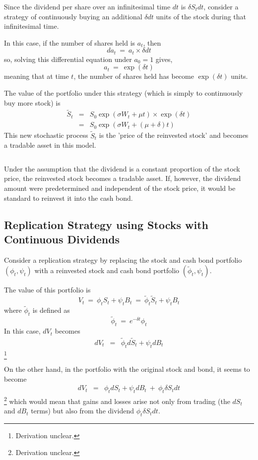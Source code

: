 \documentclass[uplatex,a4j,12pt,dvipdfmx]{jsarticle}
\begin{document}
${}$

Since the dividend per share over an infinitesimal time $dt$ is $\delta S_{t} dt$, consider a strategy of continuously buying an additional $\delta dt$ units of the stock during that infinitesimal time.

In this case, if the number of shares held is $a_{t}$, then
$$
	d a_{t} \ = \ a_{t} \times \delta dt
$$
so, solving this differential equation under $a_{0}=1$ gives,
$$
	a_{t} \ = \ \exp ( \delta t )
$$
meaning that at time $t$, the number of shares held has become $\exp ( \delta t )$ units.

The value of the portfolio under this strategy (which is simply to continuously buy more stock) is
%
\begin{eqnarray*}
	\tilde{S}_{t}
	&=&
	S_{0} \exp (\sigma W_{t} + \mu t ) \times \exp ( \delta t )
	\\ &=&
	S_{0} \exp (\sigma W_{t} + ( \mu + \delta ) t )
\end{eqnarray*}
%
This new stochastic process $\tilde{S}_{t}$ is the 'price of the reinvested stock' and becomes a tradable asset in this model.

${}$

Under the assumption that the dividend is a constant proportion of the stock price, the reinvested stock becomes a tradable asset. If, however, the dividend amount were predetermined and independent of the stock price, it would be standard to reinvest it into the cash bond.

\subsection{Replication Strategy using Stocks with Continuous Dividends}

Consider a replication strategy by replacing the stock and cash bond portfolio $(\phi_{t},\psi_{t})$ with a reinvested stock and cash bond portfolio $(\tilde{\phi}_{t},\psi_{t})$.

The value of this portfolio is
$$
	V_{t}
	\ = \
	\phi_{t} S_{t} + \psi_{t} B_{t}
	\ = \
	\tilde{\phi}_{t} \tilde{S}_{t} + \psi_{t} B_{t}
$$
where $\tilde{\phi}_{t}$ is defined as
$$
	\tilde{\phi}_{t} \ = \
	e^{- \delta t} \phi_{t}
$$
In this case, $dV_{t}$ becomes
%
\begin{eqnarray*}
	dV_{t}
	&=&
	\tilde{\phi}_{t} d \tilde{S}_{t} + \psi_{t} d B_{t}
\end{eqnarray*}
%
\footnote{Derivation unclear.}

On the other hand, in the portfolio with the original stock and bond, it seems to become
%
\begin{eqnarray*}
	dV_{t}
	&=&
	\phi_{t} d S_{t} + \psi_{t} d B_{t}
	\ + \
	\phi_{t} \delta S_{t} dt
\end{eqnarray*}
%
\footnote{Derivation unclear.} which would mean that gains and losses arise not only from trading (the $dS_{t}$ and $dB_{t}$ terms) but also from the dividend $\phi_{t} \delta S_{t} dt$.
\end{document}
